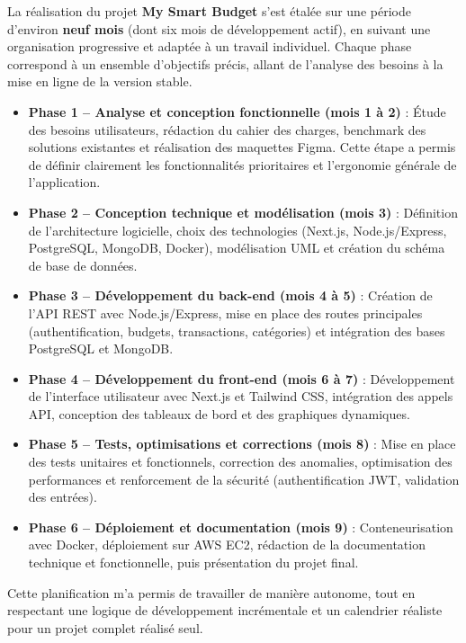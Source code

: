 \begin{tcolorbox}[colback=green!5!white,colframe=green!60!black,title=\textbf{Durée et planification du projet}]
La réalisation du projet \textbf{My Smart Budget} s'est étalée sur une période d'environ \textbf{neuf mois} (dont six mois de développement actif), en suivant une organisation progressive et adaptée à un travail individuel.
Chaque phase correspond à un ensemble d'objectifs précis, allant de l'analyse des besoins à la mise en ligne de la version stable.

\begin{itemize}
    \item \textbf{Phase 1 -- Analyse et conception fonctionnelle (mois 1 à 2)} :
    Étude des besoins utilisateurs, rédaction du cahier des charges, benchmark des solutions existantes et réalisation des maquettes Figma.  
    Cette étape a permis de définir clairement les fonctionnalités prioritaires et l'ergonomie générale de l'application.

    \item \textbf{Phase 2 -- Conception technique et modélisation (mois 3)} :
    Définition de l'architecture logicielle, choix des technologies (Next.js, Node.js/Express, PostgreSQL, MongoDB, Docker), modélisation UML et création du schéma de base de données.

    \item \textbf{Phase 3 -- Développement du back-end (mois 4 à 5)} :
    Création de l'API REST avec Node.js/Express, mise en place des routes principales (authentification, budgets, transactions, catégories) et intégration des bases PostgreSQL et MongoDB.

    \item \textbf{Phase 4 -- Développement du front-end (mois 6 à 7)} :
    Développement de l'interface utilisateur avec Next.js et Tailwind CSS, intégration des appels API, conception des tableaux de bord et des graphiques dynamiques.

    \item \textbf{Phase 5 -- Tests, optimisations et corrections (mois 8)} :
    Mise en place des tests unitaires et fonctionnels, correction des anomalies, optimisation des performances et renforcement de la sécurité (authentification JWT, validation des entrées).

    \item \textbf{Phase 6 -- Déploiement et documentation (mois 9)} :
    Conteneurisation avec Docker, déploiement sur AWS EC2, rédaction de la documentation technique et fonctionnelle, puis présentation du projet final.
\end{itemize}

Cette planification m'a permis de travailler de manière autonome, tout en respectant une logique de développement incrémentale et un calendrier réaliste pour un projet complet réalisé seul.
\end{tcolorbox}

